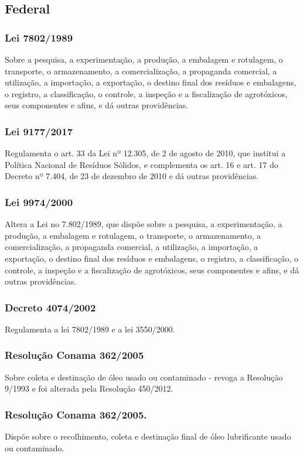 \begin{subapend}
	\subsection{Federal}
	\begin{subsubapend}
		\item \subsubsection{Lei 7802/1989}
		Sobre a pesquisa, a experimentação, a produção, a embalagem e rotulagem, o transporte, o armazenamento, a comercialização, a propaganda comercial, a utilização, a importação, a exportação, o destino final dos resíduos e embalagens, o registro, a classificação, o controle, a inspeção e a fiscalização de agrotóxicos, seus componentes e afins, e dá outras providências.
		\subsubsection{Lei 9177/2017}
		Regulamenta o art. 33 da Lei nº 12.305, de 2 de agosto de 2010, que institui a Política Nacional de Resíduos Sólidos, e complementa os art. 16 e art. 17 do Decreto nº 7.404, de 23 de dezembro de 2010 e dá outras providências.
		\subsubsection{Lei 9974/2000}
		Altera a Lei no 7.802/1989, que dispõe sobre a pesquisa, a experimentação, a produção, a embalagem e rotulagem, o transporte, o armazenamento, a comercialização, a propaganda comercial, a utilização, a importação, a exportação, o destino final dos resíduos e embalagens, o registro, a classificação, o controle, a inspeção e a fiscalização de agrotóxicos, seus componentes e afins, e dá outras providências.
		\subsubsection{Decreto 4074/2002}
		Regulamenta a lei 7802/1989 e a lei 3550/2000.
		\subsubsection{Resolução Conama 362/2005}
		Sobre coleta e destinação de óleo usado ou contaminado - revoga a Resolução 9/1993 e foi alterada pela Resolução 450/2012.
		\subsubsection{Resolução Conama 362/2005.}
		Dispõe sobre o recolhimento, coleta e destinação final de óleo lubrificante usado ou contaminado.

\end{subsubapend}
\end{subapend}
